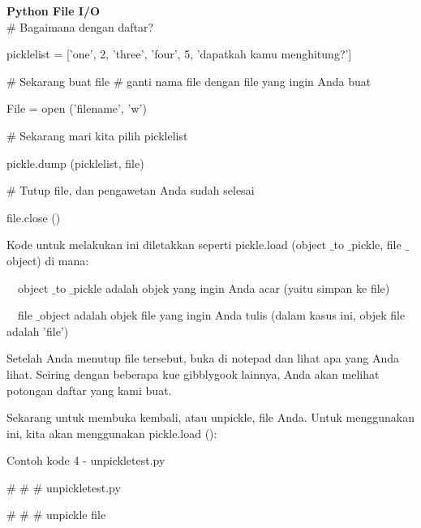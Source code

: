 \begin{center}{\fontsize{24pt}{24pt}\selectfont \textbf{Python File I/O} \\}
 $  \#  $ Bagaimana dengan daftar? 
 
picklelist = ['one', 2, 'three', 'four', 5, 'dapatkah kamu menghitung?'] 

\vspace{12pt}
 
 $  \#  $ Sekarang buat file 
 $  \#  $ ganti nama file dengan file yang ingin Anda buat 
 
File = open ('filename', 'w') 
 
\vspace{12pt}
 
 $  \#  $ Sekarang mari kita pilih picklelist 
 
pickle.dump (picklelist, file) 

\vspace{12pt}

 $  \#  $ Tutup file, dan pengawetan Anda sudah selesai 
 
file.close () 
\vspace{14pt}
 
Kode untuk melakukan ini diletakkan seperti pickle.load (object $  \_  $to $  \_  $pickle, file $  \_  $object) di mana: 

\vspace{12pt}
 
 $  $ $  $ $  $ $  $object $  \_  $to $  \_  $pickle adalah objek yang ingin Anda acar (yaitu simpan ke file) 
 
 $  $ $  $ $  $ $  $file $  \_  $object adalah objek file yang ingin Anda tulis (dalam kasus ini, objek file adalah 'file') \par
 
\vspace{12pt}
 
Setelah Anda menutup file tersebut, buka di notepad dan lihat apa yang Anda lihat. Seiring dengan beberapa kue gibblygook lainnya, Anda akan melihat potongan daftar yang kami buat. 

\vspace{12pt}

Sekarang untuk membuka kembali, atau unpickle, file Anda. Untuk menggunakan ini, kita akan menggunakan pickle.load (): 

Contoh kode 4 - unpickletest.py 

\vspace{10pt}

{\fontsize{10pt}{10pt}\selectfont  $  \#  $ $  \#  $ $  \#  $ unpickletest.py} 

{\fontsize{10pt}{10pt}\selectfont  $  \#  $ $  \#  $ $  \#  $ unpickle file} 
 

\end{center}
